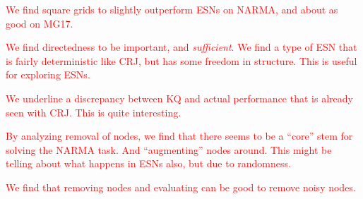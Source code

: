 \textcolor{red}{
  We find square grids to slightly outperform ESNs on NARMA, and about as good
on MG17.
}

\textcolor{red}{
  We find directedness to be important, and \textit{sufficient}. We find a type
of ESN that is fairly deterministic like CRJ, but has some freedom in
structure. This is useful for exploring ESNs.
}

\textcolor{red}{
  We underline a discrepancy between KQ and actual performance that is already
seen with CRJ. This is quite interesting.
}

\textcolor{red}{
  By analyzing removal of nodes, we find that there seems to be a ``core'' stem
for solving the NARMA task. And ``augmenting'' nodes around. This might be
telling about what happens in ESNs also, but due to randomness.
}

\textcolor{red}{
  We find that removing nodes and evaluating can be good to remove noisy nodes.
}


